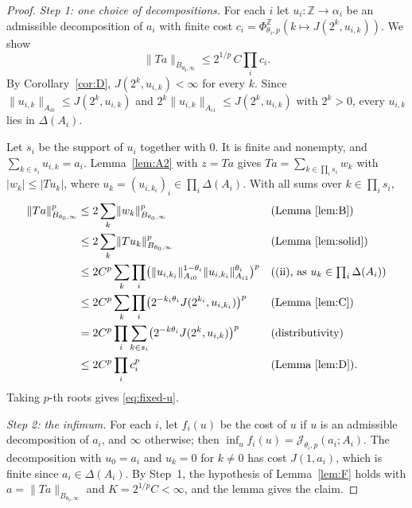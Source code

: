 \documentclass[11pt]{article}
\theoremstyle{definition}
\theoremstyle{remark}
\newcommand{\abs}[1]{\lvert #1\rvert}
\newcommand{\norm}[2]{\lVert #1\rVert_{#2}}
\newcommand{\cJ}{\mathcal J}
\newcommand{\Z}{\mathbb Z}
\begin{document}
\begin{proof}
  \emph{Step 1: one choice of decompositions.} For each \(i\) let \(u_i\colon\Z\to\alpha_i\) be
  an admissible decomposition of \(a_i\) with finite cost
  \(c_i = \Phi^{\Z}_{\theta_i,p}(k\mapsto J(2^k,u_{i,k}))\). We show
  \begin{equation}\label{eq:fixed-u}
    \norm{Ta}{B_{\theta_0,\infty}} \le 2^{1/p}\,C\prod_i c_i .
  \end{equation}
  By Corollary~\ref{cor:D}, \(J(2^k,u_{i,k})<\infty\) for every \(k\). Since
  \(\norm{u_{i,k}}{A_{i0}}\le J(2^k,u_{i,k})\) and
  \(2^k\norm{u_{i,k}}{A_{i1}}\le J(2^k,u_{i,k})\) with \(2^k>0\), every \(u_{i,k}\) lies in
  \(\Delta(A_i)\).

  Let \(s_i\) be the support of \(u_i\) together with \(0\). It is finite and nonempty, and
  \(\sum_{k\in s_i}u_{i,k} = a_i\). Lemma~\ref{lem:A2} with \(z = Ta\) gives
  \(Ta = \sum_{k\in\prod_i s_i}w_k\) with \(\abs{w_k}\le\abs{Tu_k}\), where
  \(u_k = (u_{i,k_i})_i\in\prod_i\Delta(A_i)\). With all sums over \(k\in\prod_i s_i\),
  \begin{align*}
    \norm{Ta}{B_{\theta_0,\infty}}^p
    &\le 2\sum_k\norm{w_k}{B_{\theta_0,\infty}}^p
    && \text{(Lemma~\ref{lem:B})}\\
    &\le 2\sum_k\norm{Tu_k}{B_{\theta_0,\infty}}^p
    && \text{(Lemma~\ref{lem:solid})}\\
    &\le 2C^p\sum_k\prod_i\bigl(\norm{u_{i,k_i}}{A_{i0}}^{1-\theta_i}\norm{u_{i,k_i}}{A_{i1}}^{\theta_i}\bigr)^p
    && \text{((ii), as } u_k\in\textstyle\prod_i\Delta(A_i))\\
    &\le 2C^p\sum_k\prod_i\bigl(2^{-k_i\theta_i}J(2^{k_i},u_{i,k_i})\bigr)^p
    && \text{(Lemma~\ref{lem:C})}\\
    &= 2C^p\prod_i\sum_{k\in s_i}\bigl(2^{-k\theta_i}J(2^{k},u_{i,k})\bigr)^p
    && \text{(distributivity)}\\
    &\le 2C^p\prod_i c_i^p
    && \text{(Lemma~\ref{lem:D}).}
  \end{align*}
  Taking \(p\)-th roots gives \eqref{eq:fixed-u}.

  \emph{Step 2: the infimum.} For each \(i\), let \(f_i(u)\) be the cost of \(u\) if \(u\) is
  an admissible decomposition of \(a_i\), and \(\infty\) otherwise; then
  \(\inf_u f_i(u) = \cJ_{\theta_i,p}(a_i;A_i)\). The decomposition with \(u_0 = a_i\) and
  \(u_k = 0\) for \(k\ne0\) has cost \(J(1,a_i)\), which is finite since
  \(a_i\in\Delta(A_i)\). By Step~1, the hypothesis of Lemma~\ref{lem:F} holds with
  \(a = \norm{Ta}{B_{\theta_0,\infty}}\) and \(K = 2^{1/p}C<\infty\), and the lemma gives the
  claim.
\end{proof}
\end{document}

